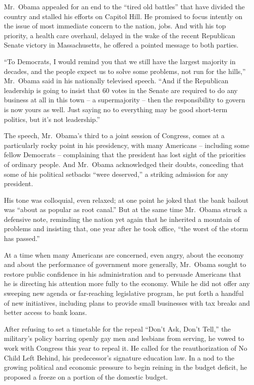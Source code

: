 ﻿\documentclass[12pt]{article}
\begin{document}

Mr.~Obama appealed for an end to the ``tired old battles'' that have divided the country and stalled
his efforts on Capitol Hill. He promised to focus intently on the issue of most immediate concern to
the nation, jobs. And with his top priority, a health care overhaul, delayed in the wake of the
recent Republican Senate victory in Massachusetts, he offered a pointed message to both parties.

``To Democrats, I would remind you that we still have the largest majority in decades, and the
people expect us to solve some problems, not run for the hills,'' Mr.~Obama said in his nationally
televised speech. ``And if the Republican leadership is going to insist that 60 votes in the Senate
are required to do any business at all in this town -- a supermajority -- then the responsibility to
govern is now yours as well. Just saying no to everything may be good short-term politics, but it's
not leadership.''

The speech, Mr.~Obama's third to a joint session of Congress, comes at a particularly rocky point in
his presidency, with many Americans -- including some fellow Democrats -- complaining that the
president has lost sight of the priorities of ordinary people. And Mr.~Obama acknowledged their
doubts, conceding that some of his political setbacks ``were deserved,'' a striking admission for
any president.

His tone was colloquial, even relaxed; at one point he joked that the bank bailout was ``about as
popular as root canal.'' But at the same time Mr.~Obama struck a defensive note, reminding the
nation yet again that he inherited a mountain of problems and insisting that, one year after he took
office, ``the worst of the storm has passed.''

At a time when many Americans are concerned, even angry, about the economy and about the performance
of government more generally, Mr.~Obama sought to restore public confidence in his administration
and to persuade Americans that he is directing his attention more fully to the economy. While he did
not offer any sweeping new agenda or far-reaching legislative program, he put forth a handful of new
initiatives, including plans to provide small businesses with tax breaks and better access to bank
loans.

After refusing to set a timetable for the repeal ``Don't Ask, Don't Tell,'' the military's policy
barring openly gay men and lesbians from serving, he vowed to work with Congress this year to repeal
it. He called for the reauthorization of No Child Left Behind, his predecessor's signature education
law. In a nod to the growing political and economic pressure to begin reining in the budget deficit,
he proposed a freeze on a portion of the domestic budget.
\end{document}
